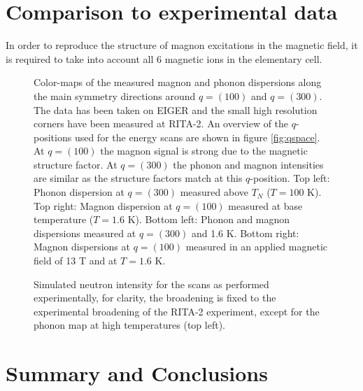 \documentclass[aps,prl,twocolumn,superscriptaddress,amsmath,amssymb,floats,aps,10pt]{revtex4-1}
\begin{document}
\section{Comparison to experimental data}
In order to reproduce the structure of magnon excitations in the magnetic field, it is required to take into account all 6 magnetic ions in the elementary cell.
\begin{figure*}[]
\caption{
Color-maps of the measured magnon and phonon dispersions along the main symmetry directions around $q=(100)$ and $q=(300)$. The data has been taken on EIGER and the small high resolution corners have been measured at \mbox{RITA-2}. An   overview of the $q$-positions used for the energy scans are shown in figure \ref{fig:qspace}. At $q=(100)$ the magnon signal is strong due to the magnetic structure factor. At $q=(300)$ the phonon and magnon intensities are similar as   the structure factors match at this $q$-position.
Top left: Phonon dispersion at $q=(300)$ measured above $T_N$ ($T=100$ K). Top right: Magnon dispersion at $q=(100)$ measured at base temperature ($T=1.6$ K). Bottom left: Phonon and magnon dispersions measured at $q=(300)$ and 1.6 K.   Bottom right: Magnon dispersions at $q=(100)$ measured in an applied magnetic field of 13 T and at $T=1.6$ K.
\label{fig:maps}}
\end{figure*}


\begin{figure*}[]
\caption{Simulated neutron intensity for the scans as performed experimentally, for clarity, the broadening is fixed to the experimental broadening of the \mbox{RITA-2} experiment, except for the phonon map at high temperatures (top     left).}
\label{fig_maps_calc}
\end{figure*}

\section{Summary and Conclusions}




% 
{}
\end{document}
